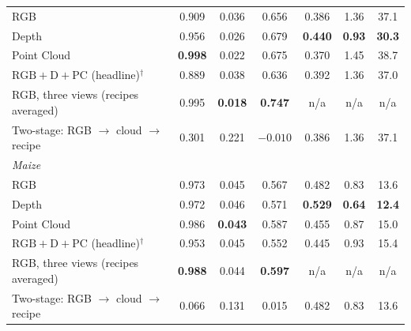 \documentclass[10pt,twocolumn,letterpaper]{article}
\begin{document}
\begin{table}[t]
\begin{tabular}{l cc c ccc}
    RGB & 0.909 & 0.036 & 0.656 & 0.386 & 1.36 & 37.1 \\
    Depth & 0.956 & 0.026 & 0.679 & \textbf{0.440} & \textbf{0.93} & \textbf{30.3} \\
    Point Cloud & \textbf{0.998} & 0.022 & 0.675 & 0.370 & 1.45 & 38.7 \\
    $\mathrm{RGB}+\mathrm{D}+\mathrm{PC}$ (headline)$^\dagger$ & 0.889 & 0.038 & 0.636 & 0.392 & 1.36 & 37.0 \\
    RGB, three views (recipes averaged) & 0.995 & \textbf{0.018} & \textbf{0.747} & n/a& n/a& n/a\\
    \midrule
    Two-stage: RGB $\to$ cloud $\to$ recipe & 0.301 & 0.221 & $-0.010$ & 0.386 & 1.36 & 37.1 \\
    \midrule
    \multicolumn{7}{l}{\emph{Maize}} \\
    RGB & 0.973 & 0.045 & 0.567 & 0.482 & 0.83 & 13.6 \\
    Depth & 0.972 & 0.046 & 0.571 & \textbf{0.529} & \textbf{0.64} & \textbf{12.4} \\
    Point Cloud & 0.986 & \textbf{0.043} & 0.587 & 0.455 & 0.87 & 15.0 \\
    $\mathrm{RGB}+\mathrm{D}+\mathrm{PC}$ (headline)$^\dagger$ & 0.953 & 0.045 & 0.552 & 0.445 & 0.93 & 15.4 \\
    RGB, three views (recipes averaged) & \textbf{0.988} & 0.044 & \textbf{0.597} & n/a& n/a& n/a\\
    \midrule
    Two-stage: RGB $\to$ cloud $\to$ recipe & 0.066 & 0.131 & 0.015 & 0.482 & 0.83 & 13.6 \\
    \bottomrule
  \end{tabular}
\end{table}
\end{document}
